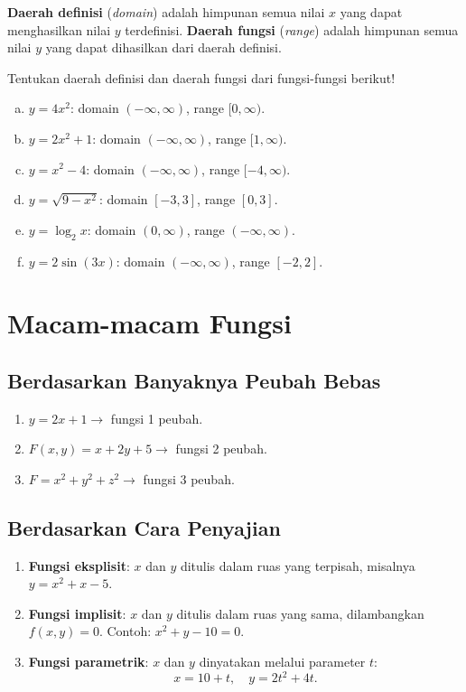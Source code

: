 \textbf{Daerah definisi} (\textit{domain}) adalah himpunan semua nilai $x$ yang dapat menghasilkan nilai $y$ terdefinisi. \textbf{Daerah fungsi} (\textit{range}) adalah himpunan semua nilai $y$ yang dapat dihasilkan dari daerah definisi.

\begin{exmp}
Tentukan daerah definisi dan daerah fungsi dari fungsi-fungsi berikut!

\begin{enumerate}[(a)]
\item $y = 4x^2$: domain $(-\infty, \infty)$, range $[0, \infty)$.
\item $y = 2x^2 + 1$: domain $(-\infty, \infty)$, range $[1, \infty)$.
\item $y = x^2 - 4$: domain $(-\infty, \infty)$, range $[-4, \infty)$.
\item $y = \sqrt{9 - x^2}$: domain $[-3, 3]$, range $[0, 3]$.
\item $y = \log_2 x$: domain $(0, \infty)$, range $(-\infty, \infty)$.
\item $y = 2\sin(3x)$: domain $(-\infty, \infty)$, range $[-2, 2]$.
\end{enumerate}
\end{exmp}

\section{Macam-macam Fungsi}

\subsection{Berdasarkan Banyaknya Peubah Bebas}
\begin{enumerate}
\item $y = 2x + 1 \longrightarrow$ fungsi 1 peubah.
\item $F(x,y) = x + 2y + 5 \longrightarrow$ fungsi 2 peubah.
\item $F = x^2 + y^2 + z^2 \longrightarrow$ fungsi 3 peubah.
\end{enumerate}

\subsection{Berdasarkan Cara Penyajian}

\begin{enumerate}
\item \textbf{Fungsi eksplisit}: $x$ dan $y$ ditulis dalam ruas yang terpisah, misalnya $y = x^2 + x - 5$.
\item \textbf{Fungsi implisit}: $x$ dan $y$ ditulis dalam ruas yang sama, dilambangkan $f(x,y) = 0$. Contoh: $x^2 + y - 10 = 0$.
\item \textbf{Fungsi parametrik}: $x$ dan $y$ dinyatakan melalui parameter $t$:
\[
x = 10 + t, \quad y = 2t^2 + 4t.
\]
\end{enumerate}


